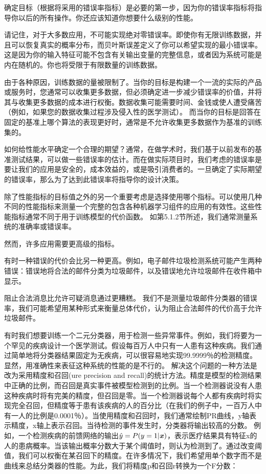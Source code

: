 确定目标（根据将采用的错误率指标）是必要的第一步，因为你的错误率指标将指导你以后的所有操作。你还应该知道你想要什么级别的性能。

请记住，对于大多数应用，不可能实现绝对零错误率。即使你有无限训练数据，并且可以恢复真实的概率分布，而贝叶斯误差定义了你可以希望实现的最小错误率。这是因为你的输入特征可能不包含有关输出变量的完整信息，或者因为系统可能是内在随机的。你也将受限于有限数量的训练数据。

由于各种原因，训练数据的量被限制了。当你的目标是构建一个一流的实际的产品或服务时，您通常可以收集更多数据，但必须确定进一步减少错误率的价值，并将其与收集更多数据的成本进行权衡。数据收集可能需要时间、金钱或使人遭受痛苦（例如，如果您的数据收集过程涉及侵入性的医学测试）。 而当你的目标是回答在固定的基准上哪个算法的表现更好时，通常是不允许收集更多数据作为基准的训练集的。

如何给性能水平确定一个合理的期望？通常，在做学术时，我们基于以前发布的基准测试结果，可以做一些错误率的估计。而在做实际项目时，我们考虑的错误率是要让我们的应用是安全的，成本效益的，或是吸引消费者的。一旦确定了实际期望的错误率，那么为了达到此错误率将指导你的设计决策。

除了性能指标的目标值之外的另一个重要考虑是选择使用哪个指标。可以使用几种不同的性能指标来测量一个完整的包含各种机器学习组件的应用的有效性。这些性能指标通常不同于用于训练模型的代价函数。 如第5.1.2节所述，我们通常测量系统的准确率或错误率。

然而，许多应用需要更高级的指标。

有时一种错误的代价会比另一种更高。例如，电子邮件垃圾检测系统可能产生两种错误：错误地将合法的邮件分类为垃圾邮件，以及错误地允许垃圾邮件在收件箱中显示。

阻止合法消息比允许可疑消息通过更糟糕。 我们不是测量垃圾邮件分类器的错误率，我们可能希望用某种形式来衡量总体代价，认为阻止合法邮件的代价高于允许垃圾邮件。

有时我们想要训练一个二元分类器，用于检测一些异常事件。例如，我们将要为一个罕见的疾病设计一个医学测试。假设每百万人中只有一人患有这种疾病。我们通过简单地将分类器结果固定为无疾病，可以很容易地实现99.9999％的检测精度。显然，用准确性来表征这种系统的性能的是不行的。 解决这个问题的一种方法是改为采用精度和召回(ure precision and recall)的统计方法。精度是模型的检测结果中正确的比例，而召回是真实事件被模型检测到的比例。当一个检测器说没有人患这种疾病时将有完美的精度，但召回是零。当一个检测器说每个人都有疾病时将实现完全召回，但精度等于患有该疾病的人的百分比（在我们的例子中，一百万人中有一人的比例是0.0001％）。当使用精度和召回时，我们通常绘制PR曲线，y轴表示精度，x轴上表示召回。当待检测的事件发生时，分类器将输出较高的分数。 例如，一个检测疾病的前馈网络的输出$\hat{y} = P(y=1|\boldsymbol{\mathit{x}})$，表示医疗结果具有特征x的人的患病概率。当该输出概率分数大于某个阈值时，则认为检测到了。通过改变阈值，我们可以权衡在某召回下的精度。在许多情况下，我们希望用单个数字而不是曲线来总结分类器的性能。为此，我们将精度p和召回r转换为一个F分数：

